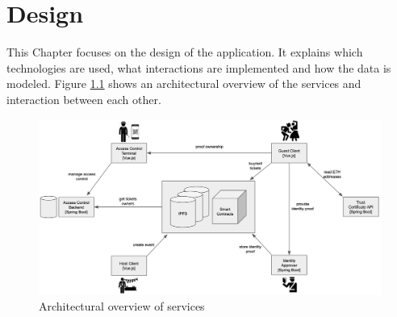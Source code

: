 \chapter{Design}\label{chapter:design}
This Chapter focuses on the design of the application. It explains which technologies are used, what interactions are implemented and how the data is modeled. Figure \ref{fig:architecutral-overview} shows an architectural overview of the services and interaction between each other. 


\begin{figure}[H]
    \centering
    \includegraphics[width=16cm]{figures/architecutal-overview.png}
    \caption{Architectural overview of services}
    \label{fig:architecutral-overview}
\end{figure}













